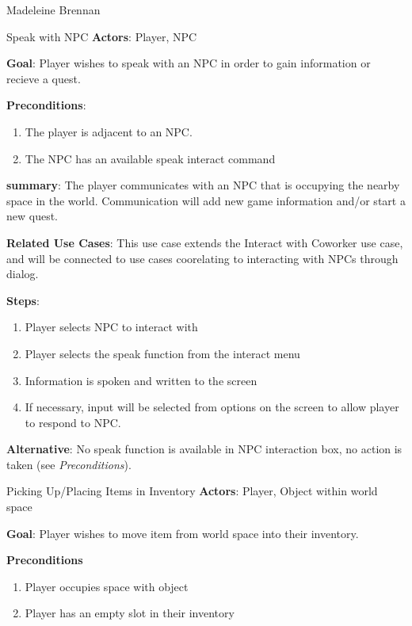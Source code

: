 \documentclass[12pt]{report}
\begin{document}
\begin{section}{Madeleine Brennan}
\begin{subsection}{Speak with NPC}
\textbf{Actors}:
Player, NPC

\textbf{Goal}:
Player wishes to speak with an NPC in order to gain information or recieve 
a quest.

\textbf{Preconditions}:
\begin{enumerate}
\item The player is adjacent to an NPC.
\item The NPC has an available speak interact command
\end{enumerate}

\textbf{summary}:
The player communicates with an NPC that is occupying the nearby space 
in the world. Communication will add new game information and/or start
a new quest.

\textbf{Related Use Cases}:
This use case extends the Interact with Coworker use case, and will be 
connected to use cases coorelating to interacting with NPCs through 
dialog.

\textbf{Steps}:
\begin{enumerate}
\item Player selects NPC to interact with
\item Player selects the speak function from the interact menu
\item Information is spoken and written to the screen
\item If necessary, input will be selected from options on the screen
	to allow player to respond to NPC.
\end{enumerate}

\textbf{Alternative}:
No speak function is available in NPC interaction box, no action is 
taken (see \textit{Preconditions}).
\end{subsection}

\begin{subsection}{Picking Up/Placing Items in Inventory}
\textbf{Actors}:
Player, Object within world space

\textbf{Goal}:
Player wishes to move item from world space into their inventory.

\textbf{Preconditions}
\begin{enumerate}
\item Player occupies space with object
\item Player has an empty slot in their inventory
\end{enumerate}


\end{subsection}
\end{section}
\end{document}
